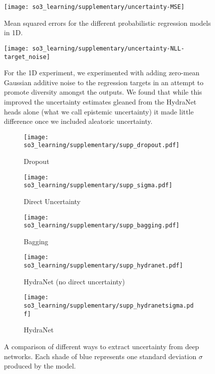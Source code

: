 \begin{figure}
	\centering
	\texttt{[image: so3\_learning/supplementary/uncertainty-MSE]}
	\caption{Mean squared errors for the different probabilistic regression models in 1D.}
	\label{fig:1d-mse}
\end{figure}


\begin{figure}
	\centering
	\texttt{[image: so3\_learning/supplementary/uncertainty-NLL-target\_noise]}
	\caption{For the 1D experiment, we experimented with adding zero-mean Gaussian additive noise to the regression targets in an attempt to promote diversity amongst the outputs. We found that while this improved the uncertainty estimates gleaned from the HydraNet heads alone (what we call epistemic uncertainty) it made little difference once we included aleatoric uncertainty.}
	\label{fig:1d-target-noise}
\end{figure}


\begin{figure*}[h!]
	\centering
	\begin{subfigure}[]{\textwidth}
		\texttt{[image: so3\_learning/supplementary/supp\_dropout.pdf]}
		\caption{Dropout}
		\label{fig:1D_dropout}
	\end{subfigure}
	\hfill
	\begin{subfigure}[]{\textwidth}
		\texttt{[image: so3\_learning/supplementary/supp\_sigma.pdf]}
		\caption{Direct Uncertainty}
		\label{fig:1D_direct}
	\end{subfigure}
	\hfill
	\begin{subfigure}[]{\textwidth}
		\texttt{[image: so3\_learning/supplementary/supp\_bagging.pdf]}
		\caption{Bagging}
		\label{fig:1D_bagging}
	\end{subfigure}
	\hfill	
	\begin{subfigure}[]{\textwidth}
		\texttt{[image: so3\_learning/supplementary/supp\_hydranet.pdf]}
		\caption{HydraNet (no direct uncertainty)}
		\label{fig:1D_hydranet_undirect}
	\end{subfigure}
	\hfill
	\begin{subfigure}[]{\textwidth}
		\texttt{[image: so3\_learning/supplementary/supp\_hydranetsigma.pdf]}
		\caption{HydraNet}
		\label{fig:1D_hydranet}
	\end{subfigure}
	\hfill		
	\caption{A comparison of different ways to extract uncertainty from deep networks. Each shade of blue represents one standard deviation $\sigma$ produced by the model.}
	\label{fig:1d_uncertainty}
\end{figure*}

